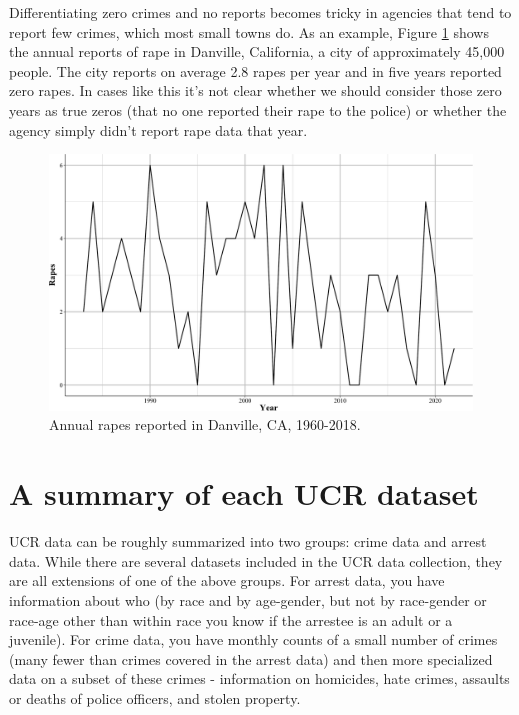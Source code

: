 \documentclass[
  12pt,
  openany]{book}
\begin{document}
Differentiating zero crimes and no reports becomes tricky in agencies that tend to report few crimes, which most small towns do. As an example, Figure \ref{fig:danvilleRape} shows the annual reports of rape in Danville, California, a city of approximately 45,000 people. The city reports on average 2.8 rapes per year and in five years reported zero rapes. In cases like this it's not clear whether we should consider those zero years as true zeros (that no one reported their rape to the police) or whether the agency simply didn't report rape data that year.

\begin{figure}

{\centering \includegraphics[width=0.9\linewidth]{ucrbook_files/figure-latex/danvilleRape-1} 

}

\caption{Annual rapes reported in Danville, CA, 1960-2018.}\label{fig:danvilleRape}
\end{figure}

\hypertarget{a-summary-of-each-ucr-dataset}{%
\section{A summary of each UCR dataset}\label{a-summary-of-each-ucr-dataset}}

UCR data can be roughly summarized into two groups: crime data and arrest data. While there are several datasets included in the UCR data collection, they are all extensions of one of the above groups. For arrest data, you have information about who (by race and by age-gender, but not by race-gender or race-age other than within race you know if the arrestee is an adult or a juvenile). For crime data, you have monthly counts of a small number of crimes (many fewer than crimes covered in the arrest data) and then more specialized data on a subset of these crimes - information on homicides, hate crimes, assaults or deaths of police officers, and stolen property.
\end{document}
